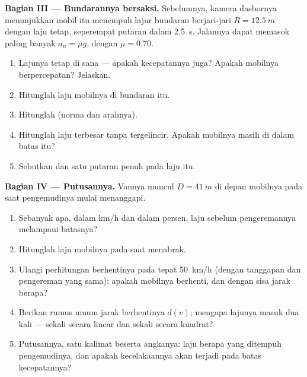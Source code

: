 \begin{problem}
\medskip
\noindent\textbf{Bagian III --- Bundarannya bersaksi.}
Sebelumnya, kamera dasbornya menunjukkan mobil itu menempuh lajur
bundaran berjari-jari $R = \qty{12.5}{m}$ dengan laju tetap, seperempat
putaran dalam \qty{2.5}{s}. Jalannya dapat memasok paling banyak
$a_n = \mu g$, dengan $\mu = 0.70$.
\begin{enumerate}[resume]
  \item Lajunya tetap di sana --- apakah kecepatannya juga? Apakah
        mobilnya berpercepatan? Jelaskan.
  \item Hitunglah laju mobilnya di bundaran itu.
  \item Hitunglah  (norma dan arahnya).
  \item Hitunglah laju terbesar tanpa tergelincir. Apakah mobilnya masih
        di dalam batas itu?
  \item Sebutkan  dan  satu putaran penuh pada laju itu.
\end{enumerate}

\medskip
\noindent\textbf{Bagian IV --- Putusannya.}
Vannya muncul $D = \qty{41}{m}$ di depan mobilnya pada saat pengemudinya
mulai menanggapi.
\begin{enumerate}[resume]
  \item Sebanyak apa, dalam \unit{km/h} dan dalam persen, laju sebelum
        pengeremannya melampaui batasnya?
  \item Hitunglah laju mobilnya pada saat menabrak.
  \item Ulangi perhitungan berhentinya pada tepat \qty{50}{km/h} (dengan
        tanggapan dan pengereman yang sama): apakah mobilnya berhenti,
        dan dengan sisa jarak berapa?
  \item Berikan rumus umum jarak berhentinya $d(v)$; mengapa lajunya
        masuk dua kali --- sekali secara linear dan sekali secara
        kuadrat?
  \item Putusannya, satu kalimat beserta angkanya: laju berapa yang
        ditempuh pengemudinya, dan apakah kecelakaannya akan terjadi
        pada batas kecepatannya?
\end{enumerate}
\end{problem}
